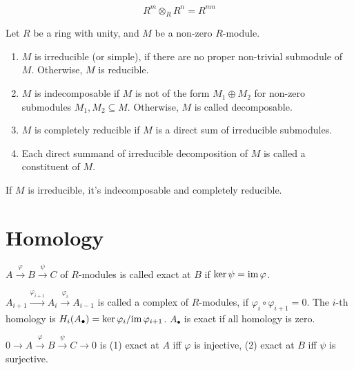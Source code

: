 \documentclass{article}
\begin{document}
\begin{theorem}
  \[R^m \otimes_R R^n = R^{mn}\]
\end{theorem}

\begin{definition}
  Let \(R\) be a ring with unity,
  and \(M\) be a non-zero \(R\)-module.
  \begin{enumerate}
  \item \(M\) is irreducible (or simple),
    if there are no proper non-trivial submodule of \(M\).
    Otherwise, \(M\) is reducible.
  \item \(M\) is indecomposable
    if \(M\) is not of the form \(M_1 \oplus M_2\) for non-zero submodules
    \(M_1, M_2 \subseteq M\).
    Otherwise, \(M\) is called decomposable.
  \item \(M\) is completely reducible
    if \(M\) is a direct sum of irreducible submodules.
  \item Each direct summand of irreducible decomposition of \(M\)
    is called a constituent of \(M\).
  \end{enumerate}
\end{definition}

\begin{theorem}
  If \(M\) is irreducible, it's indecomposable and completely reducible.
\end{theorem}

\section*{Homology}

\begin{definition}
  \(A \xrightarrow{\varphi} B \xrightarrow{\psi} C\)
  of \(R\)-modules is called exact at \(B\) if \(\ker \psi = \textnormal{im}\, \varphi\).
\end{definition}

\begin{definition}
  \(A_{i+1} \xrightarrow{\varphi_{i+1}} A_{i} \xrightarrow{\varphi_{i}} A_{i-1}\)
  is called a complex of \(R\)-modules, if \(\varphi_i \circ \varphi_{i+1} = 0\).
  The \(i\)-th homology is
  \(H_i(A_\bullet) = \ker \varphi_i / \textnormal{im}\, \varphi_{i+1}\).
  \(A_\bullet\) is exact if all homology is zero.
\end{definition}

\begin{theorem}
  \(0 \to A \xrightarrow{\varphi} B \xrightarrow{\psi} C \to 0\)
  is
  (1) exact at \(A\) iff \(\varphi\) is injective,
  (2) exact at \(B\) iff \(\psi\) is surjective.
\end{theorem}
\end{document}
